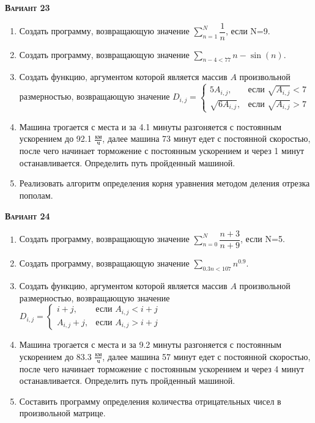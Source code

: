 \textsc{\textbf{Вариант 23}}
\begin{enumerate}
\item  Создать программу, возвращающую значение $\sum\limits_{n=1}^{N} {\dfrac{1}{n} }               $, если N=9. 
\item  Создать программу, возвращающую значение $\sum\limits_{n-4<      77} n-\sin(n)                     $. 
\item Создать функцию, аргументом которой является массив $A$ произвольной размерностью, возвращающую значение $D_{i,j}=\begin{cases} 5 A_{i,j}, & \text{если } \sqrt{A_{i,j}}<7 \\ \sqrt{ 6 A_{i,j}}, & \text{если } \sqrt{A_{i,j}}>7 \end{cases}           $ 
\item Машина трогается с места и за  4.1 минуты разгоняется с постоянным ускорением до 92.1 ${\frac{км}{ч}}$, далее машина   73 минут едет с постоянной скоростью, после чего начинает торможение с постоянным ускорением и через   1 минут останавливается. Определить путь пройденный машиной.  \item Реализовать алгоритм определения корня уравнения методом деления отрезка пополам.                                                                                                                                                                                              

\end{enumerate}
\textsc{\textbf{Вариант 24}}
\begin{enumerate}
\item  Создать программу, возвращающую значение $\sum\limits_{n=0}^{N} \dfrac{n+3}{n+9}              $, если N=5. 
\item  Создать программу, возвращающую значение $\sum\limits_{0.3n<    107} {n}^{0.9}                     $. 
\item Создать функцию, аргументом которой является массив $A$ произвольной размерностью, возвращающую значение $D_{i,j}=\begin{cases} i+j, & \text{если } {A_{i,j}}<i+j \\  A_{i,j}+j, & \text{если } {A_{i,j}}>i+j \end{cases}                              $ 
\item Машина трогается с места и за  9.2 минуты разгоняется с постоянным ускорением до 83.3 ${\frac{км}{ч}}$, далее машина   57 минут едет с постоянной скоростью, после чего начинает торможение с постоянным ускорением и через   4 минут останавливается. Определить путь пройденный машиной.  \item Составить программу определения количества отрицательных чисел в произвольной матрице.                                                                                                                                                                                    

\end{enumerate}
